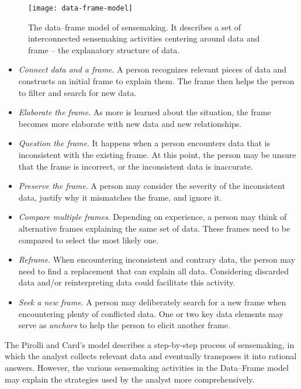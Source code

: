 \begin{figure}[!htb]
	\centering
	\texttt{[image: data-frame-model]}
	\caption{The data--frame model of sensemaking. It describes a set of interconnected sensemaking activities centering around data and frame -- the explanatory structure of data. }
	\label{fig:lr-data-frame-model}
\end{figure}

\begin{itemize}
	\item \emph{Connect data and a frame}. A person recognizes relevant pieces of data and constructs an initial frame to explain them. The frame then helps the person to filter and search for new data.
	\item \emph{Elaborate the frame}. As more is learned about the situation, the frame becomes more elaborate with new data and new relationships. 
	\item \emph{Question the frame}. It happens when a person encounters data that is inconsistent with the existing frame. At this point, the person may be unsure that the frame is incorrect, or the inconsistent data is inaccurate.
	\item \emph{Preserve the frame}. A person may consider the severity of the inconsistent data, justify why it mismatches the frame, and ignore it.
	\item \emph{Compare multiple frames}. Depending on experience, a person may think of alternative frames explaining the same set of data. These frames need to be compared to select the most likely one.
	\item \emph{Reframe}. When encountering inconsistent and contrary data, the person may need to find a replacement that can explain all data. Considering discarded data and/or reinterpreting data could facilitate this activity.
	\item \emph{Seek a new frame}. A person may deliberately search for a new frame when encountering plenty of conflicted data. One or two key data elements may serve as \emph{anchors} to help the person to elicit another frame.
\end{itemize}

The Pirolli and Card's model describes a step-by-step process of sensemaking, in which the analyst collects relevant data and eventually transposes it into rational answers. However, the various sensemaking activities in the Data--Frame model may explain the strategies used by the analyst more comprehensively.
